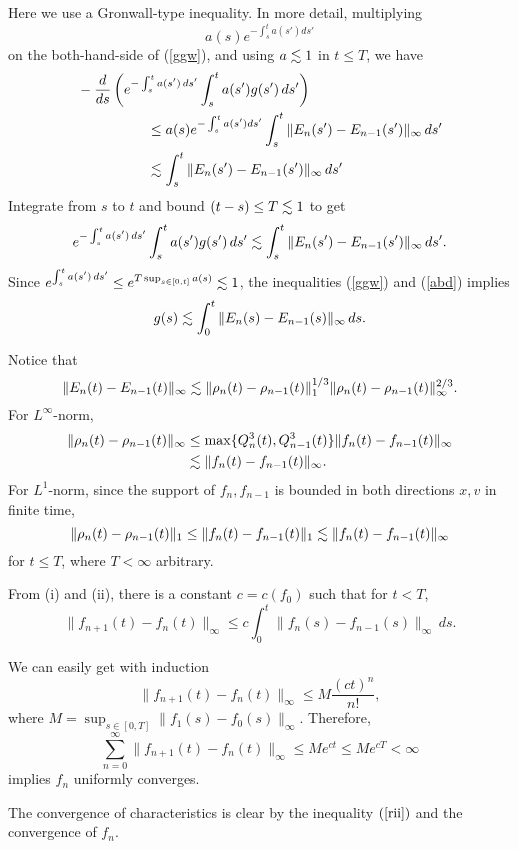 \documentclass[11pt]{amsart}
\begin{document}
\begin{pfs}
Here we use a Gronwall-type inequality.
In more detail, multiplying
\[a(s)e^{-\int_s^ta(s')ds'}\]
on the both-hand-side of (\ref{ggw}), and using $a\lesssim 1$ in $t\le T$, we have
\begin{align*}
&-\dd{s}\left(e^{-\int_s^ta(s')\,ds'}\int_s^ta(s')g(s')\,ds'\right)\\
&\hspace{5em}\le a(s)e^{-\int_s^ta(s')ds'}\int_s^t\|E_n(s')-E_{n-1}(s')\|_\infty\,ds'\\
&\hspace{5em}\les\int_s^t\|E_n(s')-E_{n-1}(s')\|_\infty\,ds'
\end{align*}
Integrate from $s$ to $t$ and bound $(t-s)\le T\lesssim1$ to get
\begin{align}\label{abd}
e^{-\int_s^ta(s')\,ds'}\int_s^ta(s')g(s')\,ds'\lesssim\int_s^t\|E_n(s')-E_{n-1}(s')\|_\infty\,ds'.
\end{align}
Since $e^{\int_s^ta(s')\,ds'}\le e^{T\sup_{s\in[0,t]}a(s)}\lesssim1$, the inequalities (\ref{ggw}) and (\ref{abd}) implies
\begin{align}\label{rii}
g(s)\lesssim\int_0^t\|E_n(s)-E_{n-1}(s)\|_\infty\,ds.
\end{align}

\item
Notice that
\[\|E_n(t)-E_{n-1}(t)\|_\infty\lesssim\|\rho_n(t)-\rho_{n-1}(t)\|_1^{1/3}\|\rho_n(t)-\rho_{n-1}(t)\|_\infty^{2/3}.\]
For $L^\infty$-norm,
\begin{align*}
\|\rho_n(t)-\rho_{n-1}(t)\|_\infty
&\le\max\{Q_n^3(t),Q_{n-1}^3(t)\}\|f_n(t)-f_{n-1}(t)\|_\infty\\
&\lesssim\|f_n(t)-f_{n-1}(t)\|_\infty.
\end{align*}
For $L^1$-norm, since the support of $f_n,f_{n-1}$ is bounded in both directions $x,v$ in finite time,
\[\|\rho_n(t)-\rho_{n-1}(t)\|_1\le\|f_n(t)-f_{n-1}(t)\|_1\lesssim\|f_n(t)-f_{n-1}(t)\|_\infty\]
for $t\le T$, where $T<\infty$ arbitrary.

\item
From (i) and (ii), there is a constant $c=c(f_0)$ such that for $t<T$,
\[\|f_{n+1}(t)-f_n(t)\|_\infty\le c\int_0^t\|f_n(s)-f_{n-1}(s)\|_\infty\,ds.\]

We can easily get with induction
\[\|f_{n+1}(t)-f_n(t)\|_\infty\le M\frac{(ct)^n}{n!},\]
where $M=\sup_{s\in[0,T]}\|f_1(s)-f_0(s)\|_\infty$.
Therefore,
\[\sum_{n=0}^\infty\|f_{n+1}(t)-f_n(t)\|_\infty\le Me^{ct}\le Me^{cT}<\infty\]
implies $f_n$ uniformly converges.

\item
The convergence of characteristics is clear by the inequality $(\ref{rii})$ and the convergence of $f_n$.
\qedhere
\end{pfs}
\end{document}
